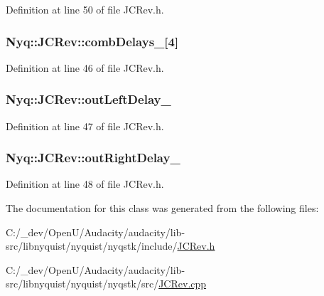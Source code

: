 Definition at line 50 of file J\+C\+Rev.\+h.

\subsubsection[{\texorpdfstring{comb\+Delays\+\_\+}{combDelays_}}]{ Nyq\+::\+J\+C\+Rev\+::comb\+Delays\+\_\+\mbox{[}4\mbox{]}\hspace{0.3cm}{\ttfamily [protected]}}\hypertarget{class_nyq_1_1_j_c_rev_a31892bd62f1b742ed6a26a0eada74d62}{}\label{class_nyq_1_1_j_c_rev_a31892bd62f1b742ed6a26a0eada74d62}


Definition at line 46 of file J\+C\+Rev.\+h.

\subsubsection[{\texorpdfstring{out\+Left\+Delay\+\_\+}{outLeftDelay_}}]{ Nyq\+::\+J\+C\+Rev\+::out\+Left\+Delay\+\_\+\hspace{0.3cm}{\ttfamily [protected]}}\hypertarget{class_nyq_1_1_j_c_rev_a87b2ebba166098a298d8c69908ab4223}{}\label{class_nyq_1_1_j_c_rev_a87b2ebba166098a298d8c69908ab4223}


Definition at line 47 of file J\+C\+Rev.\+h.

\subsubsection[{\texorpdfstring{out\+Right\+Delay\+\_\+}{outRightDelay_}}]{ Nyq\+::\+J\+C\+Rev\+::out\+Right\+Delay\+\_\+\hspace{0.3cm}{\ttfamily [protected]}}\hypertarget{class_nyq_1_1_j_c_rev_accd2119bb6707300ce2fb586b92d6ac2}{}\label{class_nyq_1_1_j_c_rev_accd2119bb6707300ce2fb586b92d6ac2}


Definition at line 48 of file J\+C\+Rev.\+h.



The documentation for this class was generated from the following files\+:\begin{DoxyCompactItemize}
\item 
C\+:/\+\_\+dev/\+Open\+U/\+Audacity/audacity/lib-\/src/libnyquist/nyquist/nyqstk/include/\hyperlink{_j_c_rev_8h}{J\+C\+Rev.\+h}\item 
C\+:/\+\_\+dev/\+Open\+U/\+Audacity/audacity/lib-\/src/libnyquist/nyquist/nyqstk/src/\hyperlink{_j_c_rev_8cpp}{J\+C\+Rev.\+cpp}\end{DoxyCompactItemize}
